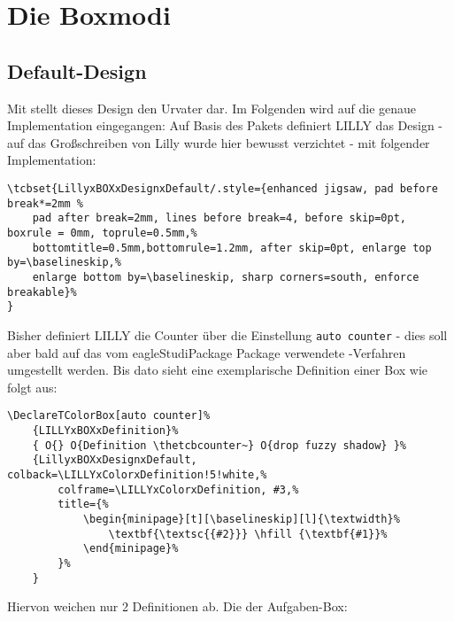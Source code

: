 \section{Die Boxmodi}
\subsection{Default-Design}
Mit  stellt dieses Design den Urvater dar. Im Folgenden wird auf die genaue Implementation eingegangen:\newline
Auf Basis des Pakets  definiert LILLY das Design  - auf das Großschreiben von Lilly wurde hier bewusst verzichtet - mit folgender Implementation:
{\begin{lstlisting}[language=lLatex]
\tcbset{LillyxBOXxDesignxDefault/.style={enhanced jigsaw, pad before break*=2mm %
    pad after break=2mm, lines before break=4, before skip=0pt, boxrule = 0mm, toprule=0.5mm,%
    bottomtitle=0.5mm,bottomrule=1.2mm, after skip=0pt, enlarge top by=\baselineskip,%
    enlarge bottom by=\baselineskip, sharp corners=south, enforce breakable}%
}
\end{lstlisting}}
Bisher definiert LILLY die Counter über die Einstellung \verb|auto counter| - dies soll aber bald auf das vom eagleStudiPackage Package verwendete -Verfahren umgestellt werden. Bis dato sieht eine exemplarische Definition einer Box wie folgt aus:
{\begin{lstlisting}[language=lLatex]
\DeclareTColorBox[auto counter]%
    {LILLYxBOXxDefinition}%
    { O{} O{Definition \thetcbcounter~} O{drop fuzzy shadow} }%
    {LillyxBOXxDesignxDefault, colback=\LILLYxColorxDefinition!5!white,%
        colframe=\LILLYxColorxDefinition, #3,%
        title={%
            \begin{minipage}[t][\baselineskip][l]{\textwidth}%
                \textbf{\textsc{{#2}}} \hfill {\textbf{#1}}%
            \end{minipage}%
        }%
    }
\end{lstlisting}}
Hiervon weichen nur 2 Definitionen ab. Die der Aufgaben-Box:
